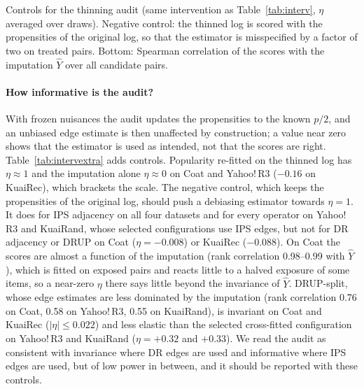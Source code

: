 \begin{table}[t]\centering\small
\caption{Controls for the thinning audit (same intervention as
Table~\ref{tab:interv}, $\eta$ averaged over draws). Negative control: the
thinned log is scored with the propensities of the original log, so that the
estimator is misspecified by a factor of two on treated pairs. Bottom: Spearman
correlation of the scores with the imputation $\hat Y$ over all candidate
pairs.}\label{tab:intervextra}
\begin{adjustbox}{max width=\textwidth}

\end{adjustbox}
\end{table}

\paragraph{How informative is the audit?} With frozen nuisances the audit updates the
propensities to the known $p/2$, and an unbiased edge estimate is then unaffected by
construction; a value near zero shows that the estimator is used as intended, not that the
scores are right. Table~\ref{tab:intervextra} adds controls. Popularity re-fitted on the
thinned log has $\eta\approx1$ and the imputation alone $\eta\approx0$ on Coat and
Yahoo!\,R3 ($-0.16$ on KuaiRec), which brackets the scale. The negative control, which
keeps the propensities of the original log, should push a debiasing estimator towards
$\eta=1$. It does for IPS adjacency on all four datasets and for every operator on
Yahoo!\,R3 and KuaiRand, whose selected configurations use IPS edges, but not for DR
adjacency or DRUP on Coat ($\eta=-0.008$) or KuaiRec ($-0.088$). On Coat the scores are
almost a function of the imputation (rank correlation 0.98--0.99 with $\hat Y$), which is
fitted on exposed pairs and reacts little to a halved exposure of some items, so a
near-zero $\eta$ there says little beyond the invariance of $\hat Y$. DRUP-split, whose
edge estimates are less dominated by the imputation (rank correlation 0.76 on Coat, 0.58
on Yahoo!\,R3, 0.55 on KuaiRand), is invariant on Coat and KuaiRec ($|\eta|\le0.022$) and
less elastic than the selected cross-fitted configuration on Yahoo!\,R3 and KuaiRand
($\eta=+0.32$ and $+0.33$). We read the audit as consistent with invariance where DR edges
are used and informative where IPS edges are used, but of low power in between, and it
should be reported with these controls.
